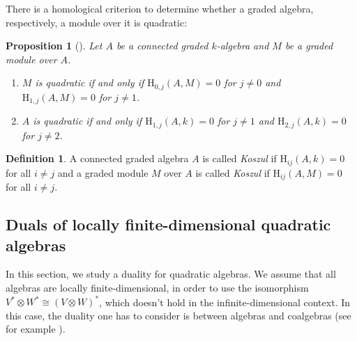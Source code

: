 \documentclass{amsart}
\newtheorem{prop}[thm]{Proposition}
\theoremstyle{definition}
\newtheorem{defn}[thm]{Definition}
\theoremstyle{remark}
\newcommand{\rmH}{\mathrm{H}}
\numberwithin{equation}{section}
\begin{document}
There is a homological criterion to determine whether a graded algebra, respectively, a module over it is quadratic:
\begin{prop}[{\cite[Chapter 1 Corollary 5.3]{PositselskiPolishchuk2005}}]
    \label{prop:QuadraticByCohomology}
    Let $A$ be a connected graded $k$-algebra and $M$ be a graded module over $A$. 
    \begin{enumerate}
        \item $M$ is quadratic if and only if $\rmH_{0,j}(A,M)=0$ for $j\neq 0$ and $\rmH_{1,j}(A,M)=0$ for $j\neq 1$.
        \item $A$ is quadratic if and only if $\rmH_{1,j}(A,k)=0$ for $j\neq 1$ and $\rmH_{2,j}(A,k)=0$ for $j\neq 2$.
    \end{enumerate}
\end{prop}
\begin{defn}
    A connected graded algebra $A$ is called \emph{Koszul} if $\rmH_{ij}(A,k)=0$ for all $i\neq j$ and a graded module $M$ over $A$ is called \emph{Koszul} if $\rmH_{ij}(A,M)=0$ for all $i\neq j$. 
\end{defn}
\subsection{Duals of locally finite-dimensional quadratic algebras}
In this section, we study a duality for quadratic algebras. We assume that all algebras are locally finite-dimensional, in order to use the isomorphism $V^*\otimes W^*\cong (V\otimes W)^*$, which doesn't hold in the infinite-dimensional context. In this case, the duality one has to consider is between algebras and coalgebras (see for example \cites{PositselskiVishik1995,Positselski2005}).
\end{document}
